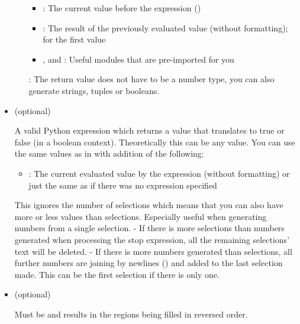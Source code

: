 \documentclass[letterpaper,12pt,english]{sphinxmanual}
\begin{document}
\begin{itemize}
\begin{itemize}
\begin{itemize}
\item {} 
\sphinxcode{\sphinxupquote{\_}}: The current value before the expression
()

\item {} 
: The result of the previously evaluated value (without
formatting);  for the first value

\item {} 
,  and : Useful modules that are
pre-imported for you

\end{itemize}

: The return value does not have to be a number type, you
can also generate strings, tuples or booleans.

\end{itemize}

\item {} 
 (optional)

A valid Python expression which returns a value that translates to
true or false (in a boolean context). Theoretically this can be any
value. You can use the same values as in  with addition of
the following:
\begin{itemize}
\item {} 
: The current evaluated value by the expression (without
formatting) or just the same as \sphinxcode{\sphinxupquote{\_}} if there was no expression
specified

\end{itemize}

This ignores the number of selections which means that you can also
have more or less values than selections. Especially useful when
generating numbers from a single selection. - If there is more
selections than numbers generated when processing the stop
expression, all the remaining selections’ text will be deleted. - If
there is more numbers generated than selections, all further numbers
are joining by newlines () and added to the last selection
made. This can be the first selection if there is only one.

\item {} 
 (optional)

Must be \sphinxcode{\sphinxupquote{!}} and results in the regions being filled in reversed
order.

\end{itemize}
\end{document}
